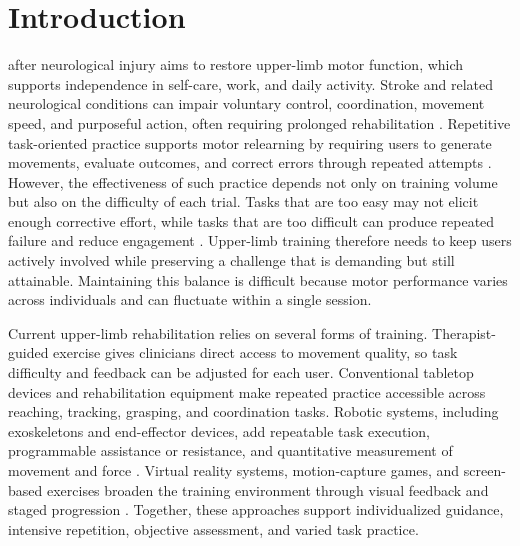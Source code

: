 \documentclass[journal,twoside,web]{ieeecolor2}
\begin{document}
\section{Introduction}
\label{sec:introduction}
 after neurological injury aims to restore upper-limb motor function, which supports independence in self-care, work, and daily activity. Stroke and related neurological conditions can impair voluntary control, coordination, movement speed, and purposeful action, often requiring prolonged rehabilitation \cite{gbdStrokeBurden2021,stinearStrokeRehab2020}. Repetitive task-oriented practice supports motor relearning by requiring users to generate movements, evaluate outcomes, and correct errors through repeated attempts \cite{maierNeurorehabPrinciples2019,leeTaskOrientedTraining2024,rozevinkTaskSpecificTraining2023}. However, the effectiveness of such practice depends not only on training volume but also on the difficulty of each trial. Tasks that are too easy may not elicit enough corrective effort, while tasks that are too difficult can produce repeated failure and reduce engagement \cite{guadagnoliChallengePoint2004,gomesTaskChallenge2025}. Upper-limb training therefore needs to keep users actively involved while preserving a challenge that is demanding but still attainable. Maintaining this balance is difficult because motor performance varies across individuals and can fluctuate within a single session.

Current upper-limb rehabilitation relies on several forms of training. Therapist-guided exercise gives clinicians direct access to movement quality, so task difficulty and feedback can be adjusted for each user. Conventional tabletop devices and rehabilitation equipment make repeated practice accessible across reaching, tracking, grasping, and coordination tasks. Robotic systems, including exoskeletons and end-effector devices, add repeatable task execution, programmable assistance or resistance, and quantitative measurement of movement and force \cite{mehrholzRobotArmTraining2018,rodgersRATULS2019,suUpperRobotTraining2024,boardsworthUpperLimbRobotic2025,wangRobotAssistedNetwork2025,aiMachineLearningRehab2023}. Virtual reality systems, motion-capture games, and screen-based exercises broaden the training environment through visual feedback and staged progression \cite{doumasSeriousGames2021,keneaImmersiveVR2025,altawilAdaptiveVR2026}. Together, these approaches support individualized guidance, intensive repetition, objective assessment, and varied task practice.
\end{document}
